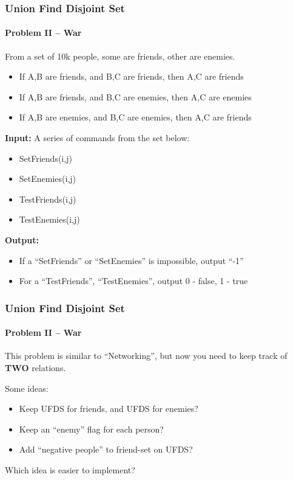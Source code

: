 \documentclass{beamer}
\begin{document}
\begin{frame}
  \frametitle{Union Find Disjoint Set}
  \framesubtitle{Problem II -- War}
  {\small
  \begin{block}{}
    From a set of 10k people, some are friends, other are enemies.
    \begin{itemize}
      \item If A,B are friends, and B,C are friends, then A,C are friends
      \item If A,B are friends, and B,C are enemies, then A,C are enemies
      \item If A,B are enemies, and B,C are enemies, then A,C are friends
    \end{itemize}

    {\bf Input:} A series of commands from the set below:
    \begin{itemize}
    \item SetFriends(i,j)
    \item SetEnemies(i,j)
    \item TestFriends(i,j)
    \item TestEnemies(i,j)
    \end{itemize}

    {\bf Output:}
    \begin{itemize}
    \item If a ``SetFriends'' or ``SetEnemies'' is impossible, output ``-1''
    \item For a ``TestFriends'', ``TestEnemies'', output 0 - false, 1 - true
    \end{itemize}
  \end{block}}

\end{frame}

\begin{frame}
  \frametitle{Union Find Disjoint Set}
  \framesubtitle{Problem II -- War}

  This problem is similar to ``Networking'', but now you need to keep
  track of {\bf TWO} relations.

  \bigskip

  Some ideas:
  \begin{itemize}
  \item Keep UFDS for friends, and UFDS for enemies?
  \item Keep an ``enemy'' flag for each person?
  \item Add ``negative people'' to friend-set on UFDS?
  \end{itemize}

  \bigskip

  Which idea is easier to implement?
\end{frame}
\end{document}
